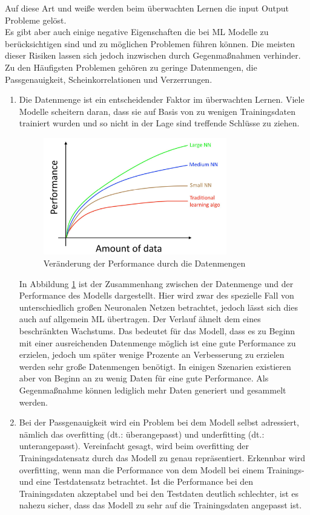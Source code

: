 \begin{onehalfspace}
        Auf diese Art und weiße werden beim überwachten Lernen die input Output Probleme gelöst.\cite{Ng2018}
        \\
        Es gibt aber auch einige negative Eigenschaften die bei \ac{ML} Modelle zu berücksichtigen sind und zu möglichen Problemen führen können. Die meisten dieser Risiken lassen sich jedoch inzwischen durch Gegenmaßnahmen verhinder. Zu den Häufigsten Problemen gehören zu geringe Datenmengen, die Passgenauigkeit, Scheinkorrelationen und Verzerrungen. 
        \begin{enumerate}
            \item Die Datenmenge ist ein entscheidender Faktor im überwachten Lernen. Viele Modelle scheitern daran, dass sie auf Basis von zu wenigen Trainingsdaten trainiert wurden und so nicht in der Lage sind treffende Schlüsse zu ziehen.\cite{Datenkommission2019}\cite{Ng2018}
            \begin{figure}[h]
                \centering
                \includegraphics[width = 8cm]{Bilder/Datenmenge.png}
                \caption{Veränderung der Performance durch die Datenmengen \cite{Ng2018}}
                \label{fig:Datavolume}
            \end{figure} 
            In Abbildung \ref*{fig:Datavolume} ist der Zusammenhang zwischen der Datenmenge und der Performance des Modells dargestellt. Hier wird zwar des spezielle Fall von unterschiedlich großen Neuronalen Netzen betrachtet, jedoch lässt sich dies auch auf allgemein \ac*{ML} übertragen. Der Verlauf ähnelt dem eines beschränkten Wachstums. Das bedeutet für das Modell, dass es zu Beginn mit einer ausreichenden Datenmenge möglich ist eine gute Performance zu erzielen, jedoch um später wenige Prozente an Verbesserung zu erzielen werden sehr große Datenmengen benötigt.\cite{Ng2018} In einigen Szenarien existieren aber von Beginn an zu wenig Daten für eine gute Performance. Als Gegenmaßnahme können lediglich mehr Daten generiert und gesammelt werden.
            \item Bei der Passgenauigkeit wird ein Problem bei dem Modell selbst adressiert, nämlich das overfitting (\ac*{dt}.: \glqq{}überangepasst\grqq{}) und underfitting (\ac*{dt}.: \glqq{}unterangepasst\grqq{}). Vereinfacht gesagt, wird beim overfitting der Trainingsdatensatz durch das Modell zu genau repräsentiert. Erkennbar wird overfitting, wenn man die Performance von dem Modell bei einem Trainings- und eine Testdatensatz betrachtet. Ist die Performance bei den Trainingsdaten akzeptabel und bei den Testdaten deutlich schlechter, ist es nahezu sicher, dass das Modell zu sehr auf die Trainingsdaten angepasst ist.

\end{enumerate}
\end{onehalfspace}
